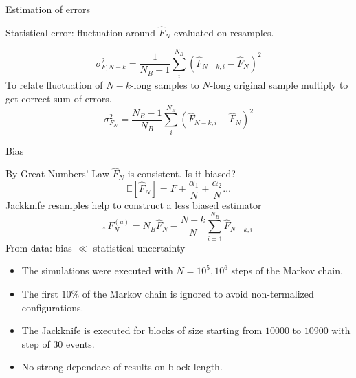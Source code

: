 \documentclass[12pt,handout]{beamer}
\begin{document}
\begin{frame}{Estimation of errors}
\begin{center}
Statistical error: fluctuation around $\hat{F}_N$ evaluated on resamples.

\[
	\sigma_{F, N-k}^2 = \frac{1}{N_B-1}\sum_i ^{N_B} \left(\hat{F}_{N-k, i} - \hat{F}_N\right)^2
\]
To relate fluctuation of $N-k$-long samples to $N$-long original sample multiply to get correct sum of errors.
\[
	\sigma_{F_N}^2 = \frac{N_B-1}{N_B}\sum_i ^{N_B} \left(\hat{F}_{N-k, i} - \hat{F}_N\right)^2
\]
\end{center}
\end{frame}

\begin{frame}{Bias}
\begin{center}
By Great Numbers' Law $\hat{F}_N$ is consistent. Is it biased?
\[
	\mathbb E \left[\hat{F}_N\right] = F + \frac{\alpha_1}{N} + \frac{\alpha _2}{N} \ldots 
\]
Jackknife resamples help to construct a less biased estimator
\[
	\hat_{F}^{\left(u\right)} _N = N_B\hat{F}_N - \frac{N-k}{N} \sum_{i = 1} ^ {N_B} \hat{F}_{N-k, i}
\]
From data: bias $\ll$ statistical uncertainty

\end{center}
\end{frame}


\begin{frame}
\begin{center}
\begin{itemize}
\item The simulations were executed with $N = 10^5, 10^6$ steps of the Markov chain.\\
\vspace{10pt}
\item The first $10\%$ of the Markov chain is ignored to avoid non-termalized configurations.\\
\vspace{10pt}
\item The Jackknife is executed for blocks of size starting from $10000$ to $10900$ with step of $30$ events. \\
\item No strong dependace of results on block length.
\end{itemize}
\end{center}
\end{frame}
\end{document}
